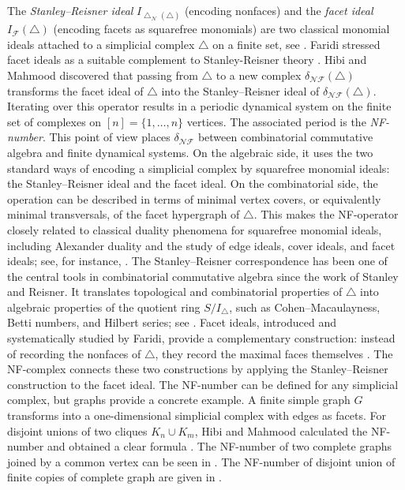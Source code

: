 \documentclass[12pt]{article}
\theoremstyle{plain}
\theoremstyle{definition}
\newcommand{\F}{\mathcal{F}}
\newcommand{\IF}{I_{\F}}
\begin{document}
	The \emph{Stanley--Reisner ideal} $I_{\bigtriangleup_{\mathcal{N}}(\bigtriangleup)}$ (encoding nonfaces) and the \emph{facet ideal} $\IF(\bigtriangleup)$ (encoding facets as squarefree monomials) are two classical monomial ideals attached to a simplicial complex $\bigtriangleup$ on a finite set, see \cite{Vizing1965,Reisner1976,Stanley1975}.
	Faridi stressed facet ideals as a suitable complement to Stanley-Reisner theory \cite{Faridi2002}. Hibi and Mahmood \cite{HibiMahmood2020} discovered that passing from $\bigtriangleup$ to a new complex $\delta_{\mathcal{NF}}(\bigtriangleup)$ transforms the facet ideal of $\bigtriangleup$ into the Stanley--Reisner ideal of $\delta_{\mathcal{NF}}(\bigtriangleup)$. Iterating over this operator results in a periodic dynamical system on the finite set of complexes on $[n]=\{1,\dots,n\}$ vertices.	The associated period is the \emph{NF-number}.  
	This point of view places $\delta_{\mathcal{NF}}$ between combinatorial commutative algebra and finite dynamical systems. On the algebraic side, it uses the two standard ways of encoding a simplicial complex by squarefree monomial ideals: the Stanley--Reisner ideal and the facet ideal. On the combinatorial side, the operation can be described in terms of minimal vertex covers, or equivalently minimal transversals, of the facet hypergraph of $\bigtriangleup$. This makes the NF-operator closely related to classical duality phenomena for squarefree monomial ideals, including Alexander duality and the study of edge ideals, cover ideals, and facet ideals; see, for instance, \cite{BrunsHerzog1998,MillerSturmfels2005,Villarreal2001,FranciscoHaVanTuyl2011}. The Stanley--Reisner correspondence has been one of the central tools in combinatorial commutative algebra since the work of Stanley and Reisner. It translates topological and combinatorial properties of $\bigtriangleup$ into algebraic properties of the quotient ring $S/I_{\bigtriangleup}$, such as Cohen--Macaulayness, Betti numbers, and Hilbert series; see \cite{Reisner1976,Stanley1975,Hochster1977,Stanley1996,bilal}. Facet ideals, introduced and systematically studied by Faridi, provide a complementary construction: instead of recording the nonfaces of $\bigtriangleup$, they record the maximal faces themselves \cite{Faridi2002}. The NF-complex connects these two constructions by applying the Stanley--Reisner construction to the facet ideal.
	The NF-number can be defined for any simplicial complex, but graphs provide a concrete example. A finite simple graph $G$ transforms into a one-dimensional simplicial complex with edges as facets. 	For disjoint unions of two cliques $K_n \cup K_m$, Hibi and Mahmood calculated the NF-number and obtained a clear formula \cite{HibiMahmood2020}. The NF-number of two complete graphs joined by a common vertex can be seen in \cite{bilalhafiz}. The NF-number of disjoint union of finite copies of complete graph are given in \cite{bilalhafiz1}.
\end{document}
